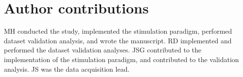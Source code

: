\section*{Author contributions}

MH conducted the study, implemented the stimulation paradigm, performed dataset validation analysis, and wrote the manuscript.
RD implemented and performed the dataset validation analyses.
JSG contributed to the implementation of the stimulation paradigm, and contributed to the validation analysis.
JS was the data acquisition lead.
